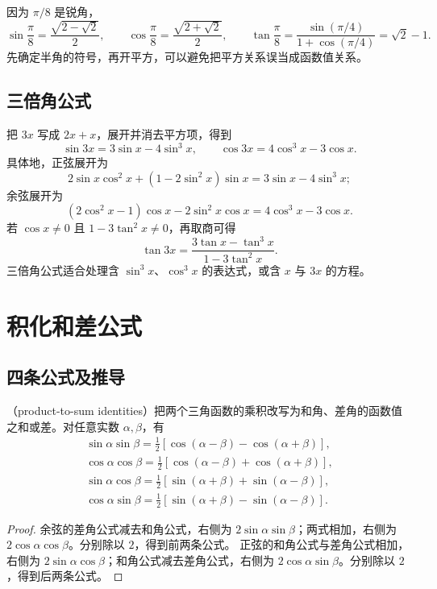 \documentclass[UTF8]{ctexart}
\begin{document}
\begin{example}[用半角求值]
因为 $\pi/8$ 是锐角，
\[
  \sin\frac\pi8=\frac{\sqrt{2-\sqrt2}}2,\qquad
  \cos\frac\pi8=\frac{\sqrt{2+\sqrt2}}2,\qquad
  \tan\frac\pi8=\frac{\sin(\pi/4)}{1+\cos(\pi/4)}=\sqrt2-1.
\]
先确定半角的符号，再开平方，可以避免把平方关系误当成函数值关系。
\end{example}

\subsection{三倍角公式}

把 $3x$ 写成 $2x+x$，展开并消去平方项，得到
\begin{equation}\label{eq:trig-triple}
  \boxed{\sin3x=3\sin x-4\sin^3x,\qquad
  \cos3x=4\cos^3x-3\cos x}.
\end{equation}
具体地，正弦展开为
\[
  2\sin x\cos^2x+(1-2\sin^2x)\sin x
  =3\sin x-4\sin^3x;
\]
余弦展开为
\[
  (2\cos^2x-1)\cos x-2\sin^2x\cos x
  =4\cos^3x-3\cos x.
\]
若 $\cos x\ne0$ 且 $1-3\tan^2x\ne0$，再取商可得
\[
  \tan3x=\frac{3\tan x-\tan^3x}{1-3\tan^2x}.
\]
三倍角公式适合处理含 $\sin^3x$、$\cos^3x$ 的表达式，或含 $x$ 与 $3x$ 的方程。

\section{积化和差公式}
\label{sec:trig-product-to-sum}

\subsection{四条公式及推导}

（product-to-sum identities）把两个三角函数的乘积改写为和角、差角的函数值之和或差。对任意实数 $\alpha,\beta$，有
\begin{align}
  \boxed{\sin\alpha\sin\beta
  =\frac12[\cos(\alpha-\beta)-\cos(\alpha+\beta)]},\label{eq:trig-prod-ss}\\
  \boxed{\cos\alpha\cos\beta
  =\frac12[\cos(\alpha-\beta)+\cos(\alpha+\beta)]},\label{eq:trig-prod-cc}\\
  \boxed{\sin\alpha\cos\beta
  =\frac12[\sin(\alpha+\beta)+\sin(\alpha-\beta)]},\label{eq:trig-prod-sc}\\
  \boxed{\cos\alpha\sin\beta
  =\frac12[\sin(\alpha+\beta)-\sin(\alpha-\beta)]}.\label{eq:trig-prod-cs}
\end{align}

\begin{proof}
余弦的差角公式减去和角公式，右侧为 $2\sin\alpha\sin\beta$；两式相加，右侧为 $2\cos\alpha\cos\beta$。分别除以 $2$，得到前两条公式。
正弦的和角公式与差角公式相加，右侧为 $2\sin\alpha\cos\beta$；和角公式减去差角公式，右侧为 $2\cos\alpha\sin\beta$。分别除以 $2$，得到后两条公式。
\end{proof}
\end{document}
